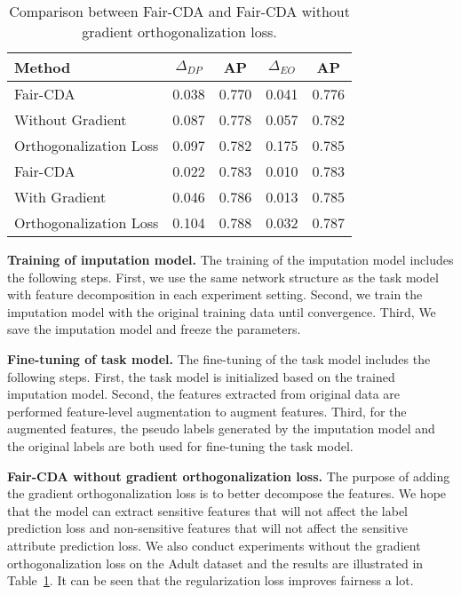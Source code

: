 \begin{table}
    \centering
    \caption{Comparison between Fair-CDA and Fair-CDA without gradient orthogonalization loss.}
    \label{table:orth_loss}
        \begin{tabular}{lcccc}
        \hline
        \hline
        Method & $\Delta_{DP}$ & AP& $\Delta_{EO}$ &AP  \\
        \hline
        Fair-CDA                 & 0.038  &	0.770  & 0.041  & 0.776\\
        Without Gradient         & 0.087  &	0.778  & 0.057  & 0.782\\
        Orthogonalization Loss   & 0.097  &	0.782  & 0.175  & 0.785\\
        \hline
        Fair-CDA                 & 0.022   & 0.783	  & 0.010   & 0.783 \\
        With Gradient            & 0.046   & 0.786   & 0.013   & 0.785\\
        Orthogonalization Loss   & 0.104   & 0.788	  & 0.032   & 0.787\\
        \hline
        \hline
        \end{tabular}
\end{table}

\noindent\textbf{Training of imputation model.} The training of the imputation model includes the following steps. First, we use the same network structure as the task model with feature decomposition in each experiment setting. Second, we train the imputation model with the original training data until convergence. Third, We save the imputation model and freeze the parameters.

\noindent\textbf{Fine-tuning of task model.} The fine-tuning of the task model includes the following steps. First, the task model is initialized based on the trained imputation model. Second,
the features extracted from original data are performed feature-level augmentation to augment features. Third, for the augmented features, the pseudo labels generated by the imputation model and the original labels are both used for fine-tuning the task model. 

\noindent\textbf{Fair-CDA without gradient orthogonalization loss.} The purpose of adding the gradient orthogonalization loss is to better decompose the features. We hope that the model can extract sensitive features that will not affect the label prediction loss and non-sensitive features that will not affect the sensitive attribute prediction loss. We also conduct experiments without the gradient orthogonalization loss on the Adult dataset and the results are illustrated in Table~\ref{table:orth_loss}. It can be seen that the regularization loss improves fairness a lot.




